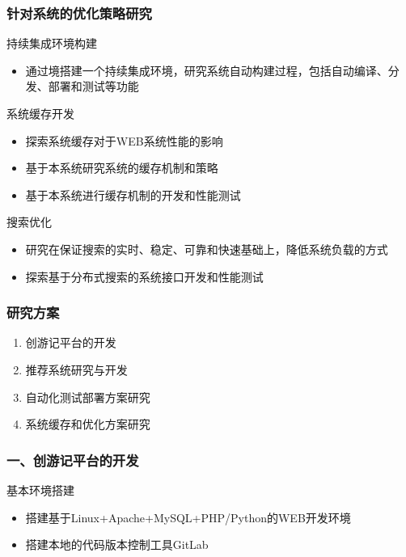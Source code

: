 \documentclass{beamer}
\begin{document}
\begin{frame}
  \frametitle{针对系统的优化策略研究}
  \begin{block}{持续集成环境构建 }
    \begin{itemize}
      \item 通过境搭建一个持续集成环境，研究系统自动构建过程，包括自动编译、分发、部署和测试等功能
    \end{itemize}
  \end{block}
  \begin{block}{系统缓存开发}
  	\begin{itemize}
  		\item 探索系统缓存对于WEB系统性能的影响
      \item 基于本系统研究系统的缓存机制和策略
      \item 基于本系统进行缓存机制的开发和性能测试
  	\end{itemize}
  \end{block}
  \begin{block}{搜索优化 }
  	\begin{itemize}
  		\item 研究在保证搜索的实时、稳定、可靠和快速基础上，降低系统负载的方式
      \item 探索基于分布式搜索的系统接口开发和性能测试
  	\end{itemize}
  \end{block}
\end{frame}

\begin{frame}
  \frametitle{研究方案}
  \begin{enumerate}
      \item<1-> 创游记平台的开发
      \item<1-> 推荐系统研究与开发
      \item<1-> 自动化测试部署方案研究
      \item<1-> 系统缓存和优化方案研究
  \end{enumerate}
\end{frame}

\begin{frame}
  \frametitle{一、创游记平台的开发}
  \begin{block}{基本环境搭建 }
	  \begin{itemize}
		  \item 搭建基于Linux+Apache+MySQL+PHP/Python的WEB开发环境
      \item 搭建本地的代码版本控制工具GitLab
	  \end{itemize}
  \end{block}
\end{frame}
\end{document}
